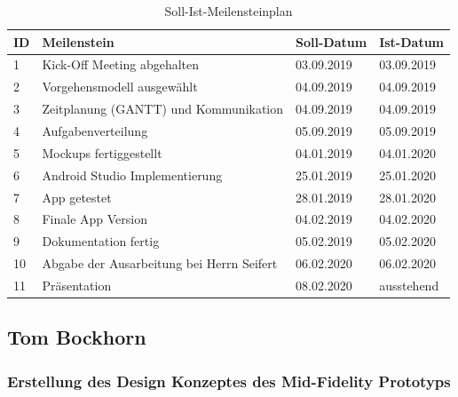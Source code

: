 \begin{table}[!h]
\begin{tabularx}{\textwidth}{|p{1em}|X|p{5em}|p{5em}|}
	\hline
	\textbf{ID}	& \textbf{Meilenstein} & \textbf{Soll-Datum} & \textbf{Ist-Datum} \\
	\hline	\hline
	1	& Kick-Off Meeting abgehalten & 03.09.2019 & 03.09.2019 \\
	\hline
	2	& Vorgehensmodell ausgewählt & 04.09.2019	& 04.09.2019 \\
	\hline
	3	& Zeitplanung (GANTT) und Kommunikation	& 04.09.2019	& 04.09.2019 \\
	\hline
	4	& Aufgabenverteilung	& 05.09.2019	& 05.09.2019 \\
	\hline
	5	& Mockups fertiggestellt	& 04.01.2019	& 04.01.2020 \\
	\hline
	6	& Android Studio Implementierung	& 25.01.2019	& 25.01.2020 \\
	\hline
	7	& App getestet	& 28.01.2019	& 28.01.2020  \\
	\hline
	8	& Finale App Version	& 04.02.2019	& 04.02.2020 \\
	\hline
	9	& Dokumentation fertig	& 05.02.2019	& 05.02.2020 \\
	\hline
	10	& Abgabe der Ausarbeitung bei Herrn Seifert	& 06.02.2020	& 06.02.2020 \\
	\hline
	11	& Präsentation	& 08.02.2020	& ausstehend \\
	\hline
\end{tabularx}
\caption{Soll-Ist-Meilensteinplan}
\end{table}

\FloatBarrier

\clearpage

\subsection{Tom Bockhorn}


\subsubsection{Erstellung des Design Konzeptes des Mid-Fidelity Prototyps }
\label{subsubsection:erstellung-des-design-konzeptes-des-mid-fidelity}

